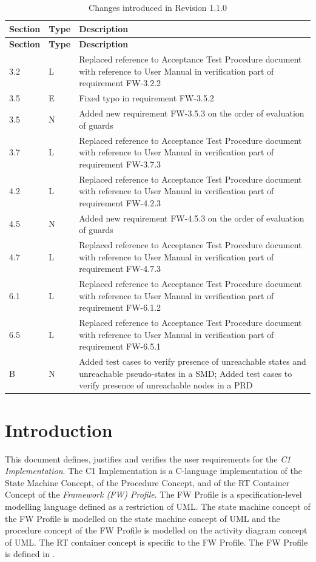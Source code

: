 \documentclass[requirements]{../fwprofile}
\begin{document}
\begin{longtable}{|p{1.5cm}|p{1cm}|p{8cm}|}
\caption{Changes introduced in Revision 1.1.0} \\
\hline
\rowcolor{light-gray}
\textbf{Section} & \textbf{Type} & \textbf{Description} \\
\hline\hline
\endfirsthead
\rowcolor{light-gray}
\textbf{Section} & \textbf{Type} & \textbf{Description} \\
\hline\hline
\endhead
3.2 & L & Replaced reference to Acceptance Test Procedure document with reference to User Manual in verification part of requirement FW-3.2.2 \\
\hline
3.5 & E & Fixed typo in requirement FW-3.5.2 \\
\hline
3.5 & N & Added new requirement FW-3.5.3 on the order of evaluation of guards \\
\hline
3.7 & L & Replaced reference to Acceptance Test Procedure document with reference to User Manual in verification part of requirement FW-3.7.3 \\
\hline
4.2 & L & Replaced reference to Acceptance Test Procedure document with reference to User Manual in verification part of requirement FW-4.2.3 \\
\hline
4.5 & N & Added new requirement FW-4.5.3 on the order of evaluation of guards \\
\hline
4.7 & L & Replaced reference to Acceptance Test Procedure document with reference to User Manual in verification part of requirement FW-4.7.3 \\
\hline
6.1 & L & Replaced reference to Acceptance Test Procedure document with reference to User Manual in verification part of requirement FW-6.1.2 \\
\hline
6.5 & L & Replaced reference to Acceptance Test Procedure document with reference to User Manual in verification part of requirement FW-6.5.1 \\
\hline
B & N & Added test cases to verify presence of unreachable states and unreachable pseudo-states in a SMD; Added test cases to verify presence of unreachable nodes in a PRD \\
\hline
\end{longtable}

\newpage


\section{Introduction}
This document defines, justifies and verifies the user requirements for the \emph{C1 Implementation}. The C1 Implementation is a C-language implementation of the State Machine Concept, of the Procedure Concept, and of the RT Container Concept of the \emph{Framework (FW) Profile}. The FW Profile is a specification-level modelling language defined as a restriction of UML. The state machine concept of the FW Profile is modelled on the state machine concept of UML and the procedure concept of the FW Profile is modelled on the activity diagram concept of UML. The RT container concept is specific to the FW Profile. The FW Profile is defined in \cite{ref:fwprofile}. 
\end{document}
